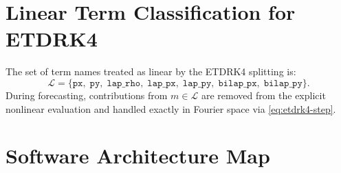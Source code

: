 \documentclass[11pt, letterpaper]{article}
\theoremstyle{definition}
\begin{document}
\section{Linear Term Classification for ETDRK4}
\label{app:linear-terms}

The set of term names treated as linear by the ETDRK4 splitting is:
\begin{equation}
  \mathcal{L} = \bigl\{
    \texttt{px},\;
    \texttt{py},\;
    \texttt{lap\_rho},\;
    \texttt{lap\_px},\;
    \texttt{lap\_py},\;
    \texttt{bilap\_px},\;
    \texttt{bilap\_py}
  \bigr\}.
\end{equation}
During forecasting, contributions from $m \in \mathcal{L}$ are
removed from the explicit nonlinear evaluation and handled exactly
in Fourier space via \eqref{eq:etdrk4-step}.

\section{Software Architecture Map}
\label{app:modules}
\end{document}
